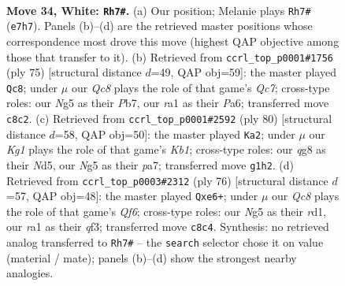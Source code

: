 \documentclass[11pt]{article}
\begin{document}
\clearpage

\begin{figure}[p]\centering
\begin{subfigure}{0.46\textwidth}\centering
\resizebox{\linewidth}{!}{%
\newchessgame
\chessboard[
  setfen={2Q3qk/4R3/6p1/5pNp/3p3P/3P2P1/5P2/rN4K1 w - - 3 34},
  showmover=false,
  pgfstyle=straightmove, color=movearrow, markmove={e7-h7}
]}
\caption{}
\end{subfigure}\hfill
\begin{subfigure}{0.46\textwidth}\centering
\resizebox{\linewidth}{!}{%
\newchessgame
\chessboard[
  setfen={6k1/1p3p2/p5p1/4P2p/1P3P1P/6P1/P1q3QK/8 b - - 9 38},
  showmover=false,
  pgfstyle=straightmove, color=movearrow, markmove={c2-c8}
]}
\caption{}
\end{subfigure}
\\[4pt]
\begin{subfigure}{0.46\textwidth}\centering
\resizebox{\linewidth}{!}{%
\newchessgame
\chessboard[
  setfen={4Qnk1/pp3pp1/8/3N1P2/2P3pP/5q2/1P6/1K6 w - - 1 41},
  showmover=false,
  pgfstyle=straightmove, color=movearrow, markmove={b1-a2}
]}
\caption{}
\end{subfigure}\hfill
\begin{subfigure}{0.46\textwidth}\centering
\resizebox{\linewidth}{!}{%
\newchessgame
\chessboard[
  setfen={4k3/8/p2ppQ1p/1p6/4PN2/PP3q2/K1P5/3r4 w - - 0 39},
  showmover=false,
  pgfstyle=straightmove, color=movearrow, markmove={f6-e6}
]}
\caption{}
\end{subfigure}
\caption{\textbf{Move 34, White: \texttt{Rh7\#}.} (a) Our position; Melanie plays \texttt{Rh7\#} (\texttt{e7h7}). Panels (b)--(d) are the retrieved master positions whose correspondence most drove this move (highest QAP objective among those that transfer to it). (b) Retrieved from \texttt{ccrl\_top\_p0001\#1756} (ply 75) [structural distance $d$=49, QAP obj=59]: the master played \texttt{Qc8}; under $\mu$ our \emph{Qc8} plays the role of that game's \emph{Qc7}; cross-type roles: our \emph{N}g5 as their \emph{P}b7, our \emph{r}a1 as their \emph{P}a6; transferred move \texttt{c8c2}. (c) Retrieved from \texttt{ccrl\_top\_p0001\#2592} (ply 80) [structural distance $d$=58, QAP obj=50]: the master played \texttt{Ka2}; under $\mu$ our \emph{Kg1} plays the role of that game's \emph{Kb1}; cross-type roles: our \emph{q}g8 as their \emph{N}d5, our \emph{N}g5 as their \emph{p}a7; transferred move \texttt{g1h2}. (d) Retrieved from \texttt{ccrl\_top\_p0003\#2312} (ply 76) [structural distance $d$=57, QAP obj=48]: the master played \texttt{Qxe6+}; under $\mu$ our \emph{Qc8} plays the role of that game's \emph{Qf6}; cross-type roles: our \emph{N}g5 as their \emph{r}d1, our \emph{r}a1 as their \emph{q}f3; transferred move \texttt{c8c4}. Synthesis: no retrieved analog transferred to \texttt{Rh7\#} -- the \texttt{search} selector chose it on value (material / mate); panels (b)--(d) show the strongest nearby analogies.}
\label{fig:thought-m66}
\end{figure}
\end{document}
